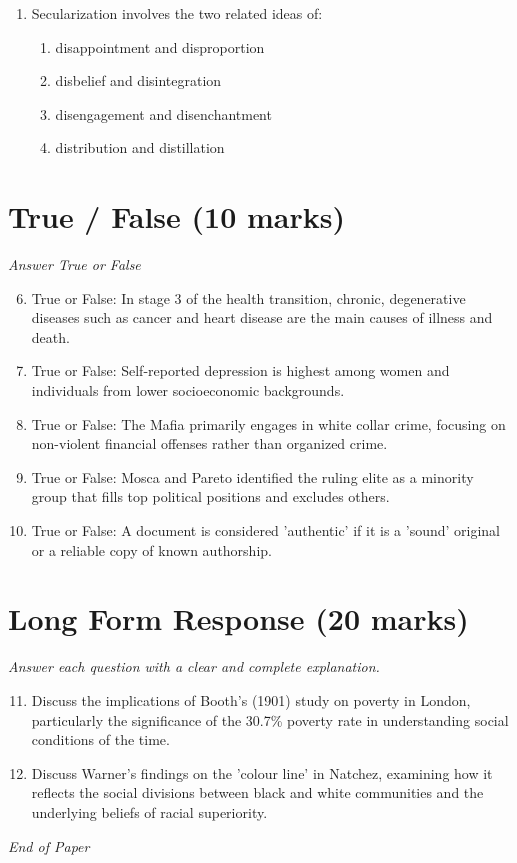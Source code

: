 \documentclass[12pt]{article}
\begin{document}
\begin{enumerate}[label=\arabic*.]
\begin{enumerate}[label=(\alph*)]
    \item a capitalist class dependent on property ownership and advantaged life chances
    \item an alignment of classes with shared interests but no state power
    \item a state elite whose members are drawn overwhelmingly from a power bloc
\end{enumerate}
\item Secularization involves the two related ideas of:
\begin{enumerate}[label=(\alph*)]
    \item disappointment and disproportion
    \item disbelief and disintegration
    \item disengagement and disenchantment
    \item distribution and distillation
\end{enumerate}
\end{enumerate}

\section*{True / False (10 marks)}
\textit{Answer True or False}
\begin{enumerate}[label=\arabic*.]
\setcounter{enumi}{5}
\item True or False: In stage 3 of the health transition, chronic, degenerative diseases such as cancer and heart disease are the main causes of illness and death.
\item True or False: Self-reported depression is highest among women and individuals from lower socioeconomic backgrounds.
\item True or False: The Mafia primarily engages in white collar crime, focusing on non-violent financial offenses rather than organized crime.
\item True or False: Mosca and Pareto identified the ruling elite as a minority group that fills top political positions and excludes others.
\item True or False: A document is considered 'authentic' if it is a 'sound' original or a reliable copy of known authorship.
\end{enumerate}

\section*{Long Form Response (20 marks)}
\textit{Answer each question with a clear and complete explanation.}
\begin{enumerate}[label=\arabic*.]
\setcounter{enumi}{10}
\item Discuss the implications of Booth's (1901) study on poverty in London, particularly the significance of the 30.7\% poverty rate in understanding social conditions of the time.
\item Discuss Warner's findings on the 'colour line' in Natchez, examining how it reflects the social divisions between black and white communities and the underlying beliefs of racial superiority.
\end{enumerate}

\vfill
\noindent\textit{End of Paper}
\end{document}
